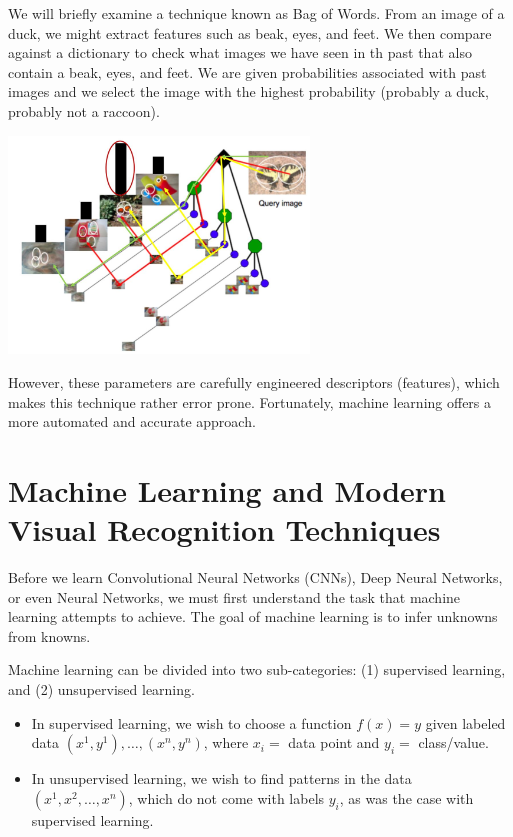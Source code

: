 \documentclass[twoside]{article}
\begin{document}
We will briefly examine a technique known as Bag of Words. From an image of a duck, we might extract features such as beak, eyes, and feet. We then compare against a dictionary to check what images we have seen in th past that also contain a beak, eyes, and feet. We are given probabilities associated with past images and we select the image with the highest probability (probably a duck, probably not a raccoon).

\begin{center}
	\includegraphics[width=0.6\textwidth]{bag_of_words}
\end{center}

However, these parameters are carefully engineered descriptors (features), which makes this technique rather error prone. Fortunately, machine learning offers a more automated and accurate approach.

\section{Machine Learning and Modern Visual Recognition Techniques}

Before we learn Convolutional Neural Networks (CNNs), Deep Neural Networks, or even Neural Networks, we must first understand the task that machine learning attempts to achieve. The goal of machine learning is to infer unknowns from knowns.

Machine learning can be divided into two sub-categories: (1) supervised learning, and (2) unsupervised learning.

\begin{itemize}
\item In supervised learning, we wish to choose a function $f(x) = y$ given labeled data $(x^1, y^1), \dots, (x^n, y^n)$, where $x_i =$ data point and $y_i =$ class/value.

\item In unsupervised learning, we wish to find patterns in the data $(x^1, x^2, \dots, x^n)$, which do not come with labels $y_i$, as was the case with supervised learning.
\end{itemize}
\end{document}

